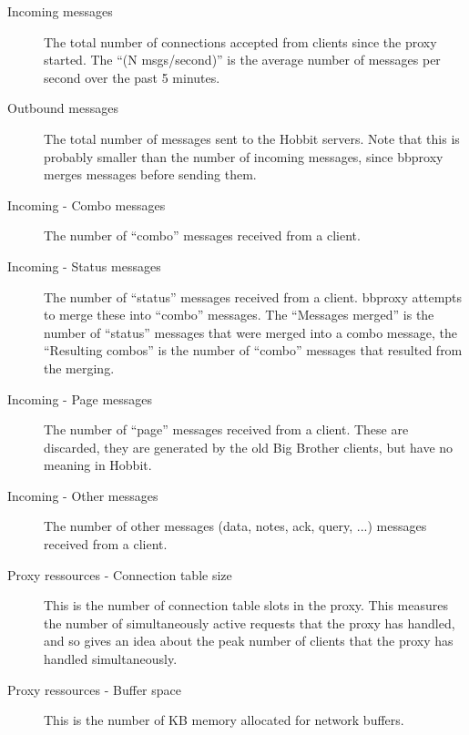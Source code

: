  \begin{description}
\item[Incoming messages] The total number of connections accepted from clients since the proxy started. The ``(N msgs/second)'' is the average number of messages per second over the past 5 minutes. 

 

\item[Outbound messages] The total number of messages sent to the Hobbit servers. Note that this is probably smaller than the number of incoming messages, since bbproxy merges messages before sending them. 

 

\item[Incoming - Combo messages] The number of ``combo'' messages received from a client. 

 

\item[Incoming - Status messages] The number of ``status'' messages received from a client. bbproxy attempts to merge these into ``combo'' messages. The ``Messages merged'' is the number of ``status'' messages that were merged into a combo message, the ``Resulting combos'' is the number of ``combo'' messages that resulted from the merging. 

 

\item[Incoming - Page messages] The number of ``page'' messages received from a client. These are discarded, they are generated by the old Big Brother clients, but have no meaning in Hobbit. 

 

\item[Incoming - Other messages] The number of other messages (data, notes, ack, query, ...) messages received from a client. 

 

\item[Proxy ressources - Connection table size] This is the number of connection table slots in the proxy. This measures the number of simultaneously active requests that the proxy has handled, and so gives an idea about the peak number of clients that the proxy has handled simultaneously. 

 

\item[Proxy ressources - Buffer space] This is the number of KB memory allocated for network buffers. 

 


\end{description}
